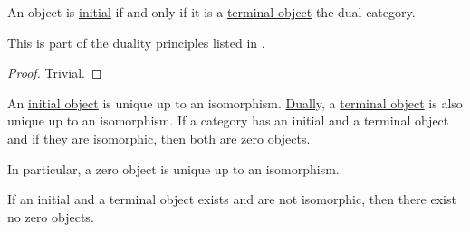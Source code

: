 \begin{proposition}\label{thm:universal_object_duality}
  An object is \hyperref[def:universal_object/initial]{initial} if and only if it is a \hyperref[def:universal_object/terminal]{terminal object} the dual category.

  This is part of the duality principles listed in .
\end{proposition}
\begin{proof}
  Trivial.
\end{proof}

\begin{proposition}\label{thm:def:universal_objects/properties}
  \hfill
  \begin{thmenum}
     An \hyperref[def:universal_objects/initial]{initial object} is unique up to an isomorphism.
     \hyperref[thm:categorical_principle_of_duality]{Dually}, a \hyperref[def:universal_objects/initial]{terminal object} is also unique up to an isomorphism.
     If a category has an initial and a terminal object and if they are isomorphic, then both are zero objects.

    In particular, a zero object is unique up to an isomorphism.

     If an initial and a terminal object exists and are not isomorphic, then there exist no zero objects.
  \end{thmenum}
\end{proposition}
